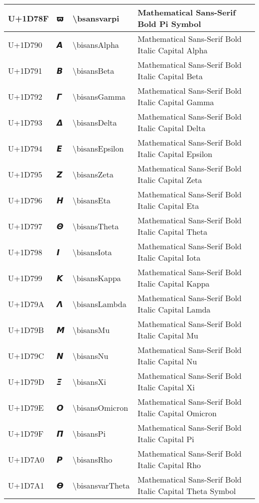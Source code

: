 \begin{table}[h]
\begin{tabulary}{\linewidth}{|L|L|L|L|}
\hline
U+1D78F & 𝞏 & {\textbackslash}bsansvarpi & Mathematical Sans-Serif Bold Pi Symbol \\
\hline
U+1D790 & 𝞐 & {\textbackslash}bisansAlpha & Mathematical Sans-Serif Bold Italic Capital Alpha \\
\hline
U+1D791 & 𝞑 & {\textbackslash}bisansBeta & Mathematical Sans-Serif Bold Italic Capital Beta \\
\hline
U+1D792 & 𝞒 & {\textbackslash}bisansGamma & Mathematical Sans-Serif Bold Italic Capital Gamma \\
\hline
U+1D793 & 𝞓 & {\textbackslash}bisansDelta & Mathematical Sans-Serif Bold Italic Capital Delta \\
\hline
U+1D794 & 𝞔 & {\textbackslash}bisansEpsilon & Mathematical Sans-Serif Bold Italic Capital Epsilon \\
\hline
U+1D795 & 𝞕 & {\textbackslash}bisansZeta & Mathematical Sans-Serif Bold Italic Capital Zeta \\
\hline
U+1D796 & 𝞖 & {\textbackslash}bisansEta & Mathematical Sans-Serif Bold Italic Capital Eta \\
\hline
U+1D797 & 𝞗 & {\textbackslash}bisansTheta & Mathematical Sans-Serif Bold Italic Capital Theta \\
\hline
U+1D798 & 𝞘 & {\textbackslash}bisansIota & Mathematical Sans-Serif Bold Italic Capital Iota \\
\hline
U+1D799 & 𝞙 & {\textbackslash}bisansKappa & Mathematical Sans-Serif Bold Italic Capital Kappa \\
\hline
U+1D79A & 𝞚 & {\textbackslash}bisansLambda & Mathematical Sans-Serif Bold Italic Capital Lamda \\
\hline
U+1D79B & 𝞛 & {\textbackslash}bisansMu & Mathematical Sans-Serif Bold Italic Capital Mu \\
\hline
U+1D79C & 𝞜 & {\textbackslash}bisansNu & Mathematical Sans-Serif Bold Italic Capital Nu \\
\hline
U+1D79D & 𝞝 & {\textbackslash}bisansXi & Mathematical Sans-Serif Bold Italic Capital Xi \\
\hline
U+1D79E & 𝞞 & {\textbackslash}bisansOmicron & Mathematical Sans-Serif Bold Italic Capital Omicron \\
\hline
U+1D79F & 𝞟 & {\textbackslash}bisansPi & Mathematical Sans-Serif Bold Italic Capital Pi \\
\hline
U+1D7A0 & 𝞠 & {\textbackslash}bisansRho & Mathematical Sans-Serif Bold Italic Capital Rho \\
\hline
U+1D7A1 & 𝞡 & {\textbackslash}bisansvarTheta & Mathematical Sans-Serif Bold Italic Capital Theta Symbol \\

\end{tabulary}
\end{table}
